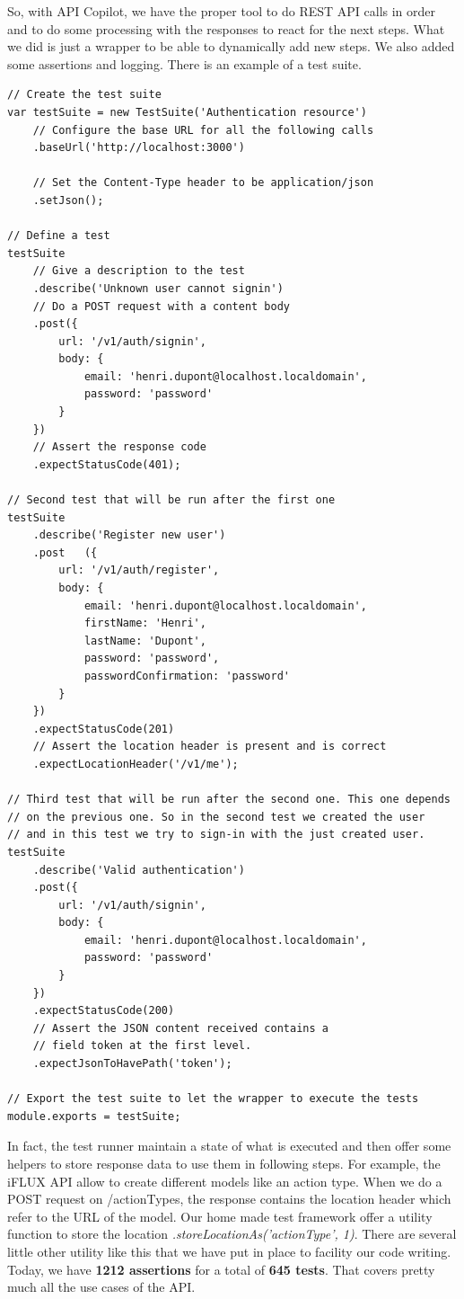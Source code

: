 So, with API Copilot, we have the proper tool to do REST API calls in order and to do some processing with the responses to react for the next steps. What we did is just a wrapper to be able to dynamically add new steps. We also added some assertions and logging. There is an example of a test suite.

\begin{lstlisting}
// Create the test suite
var testSuite = new TestSuite('Authentication resource')
	// Configure the base URL for all the following calls
	.baseUrl('http://localhost:3000')
	
	// Set the Content-Type header to be application/json
	.setJson();

// Define a test
testSuite
	// Give a description to the test
	.describe('Unknown user cannot signin')
	// Do a POST request with a content body
	.post({
		url: '/v1/auth/signin',
		body: {
			email: 'henri.dupont@localhost.localdomain',
			password: 'password'
		}
	})
	// Assert the response code
	.expectStatusCode(401);

// Second test that will be run after the first one
testSuite
	.describe('Register new user')
	.post	({
		url: '/v1/auth/register',
		body: {
			email: 'henri.dupont@localhost.localdomain',
			firstName: 'Henri',
			lastName: 'Dupont',
			password: 'password',
			passwordConfirmation: 'password'
		}
	})
	.expectStatusCode(201)
	// Assert the location header is present and is correct
	.expectLocationHeader('/v1/me');

// Third test that will be run after the second one. This one depends
// on the previous one. So in the second test we created the user
// and in this test we try to sign-in with the just created user.
testSuite
	.describe('Valid authentication')
	.post({
		url: '/v1/auth/signin',
		body: {
			email: 'henri.dupont@localhost.localdomain',
			password: 'password'
		}
	})
	.expectStatusCode(200)
	// Assert the JSON content received contains a 
	// field token at the first level.
	.expectJsonToHavePath('token');

// Export the test suite to let the wrapper to execute the tests
module.exports = testSuite;
\end{lstlisting}

In fact, the test runner maintain a state of what is executed and then offer some helpers to store response data to use them in following steps. For example, the iFLUX API allow to create different models like an action type. When we do a POST request on /actionTypes, the response contains the location header which refer to the URL of the model. Our home made test framework offer a utility function to store the location \emph{.storeLocationAs('actionType', 1)}. There are several little other utility like this that we have put in place to facility our code writing. Today, we have \textbf{1212 assertions} for a total of \textbf{645 tests}. That covers pretty much all the use cases of the API.